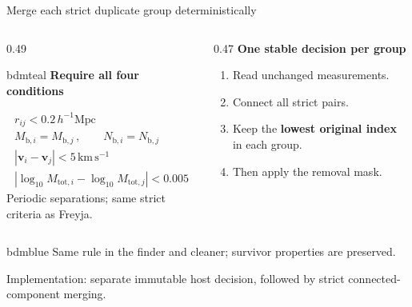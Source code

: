 \documentclass[UTF8]{beamer}
\newcommand{\bodyfont}{\fontsize{11}{13.1}\selectfont
  \setlength{\abovedisplayskip}{1.5mm}\setlength{\belowdisplayskip}{1.5mm}
  \setlength{\abovedisplayshortskip}{1mm}\setlength{\belowdisplayshortskip}{1mm}}
\newcommand{\evidence}[1]{\par\vfill{\fontsize{7.3}{9}\selectfont\color{coolgray}#1\par}}
\begin{document}
\begin{frame}{Merge each strict duplicate group deterministically}
  \bodyfont
  \begin{columns}[T,onlytextwidth]
    \begin{column}{0.49\textwidth}
      \begin{panel}{bdmteal}
        {\color{bdmteal}\bfseries Require all four conditions}\par
        \[
          \begin{gathered}
            r_{ij}<0.2\,h^{-1}\mathrm{Mpc} \\[0.4ex]
            M_{\mathrm b,i}=M_{\mathrm b,j}\,,\qquad N_{\mathrm b,i}=N_{\mathrm b,j} \\[0.4ex]
            |\boldsymbol{v}_i-\boldsymbol{v}_j|<5\,\mathrm{km\,s^{-1}} \\[0.4ex]
            |\log_{10}M_{\mathrm{tot},i}-\log_{10}M_{\mathrm{tot},j}|<0.005
          \end{gathered}
        \]
        {\small Periodic separations; same strict criteria as Freyja.}
      \end{panel}
    \end{column}
    \begin{column}{0.47\textwidth}
      {\color{bdmblue}\bfseries One stable decision per group}\par
      \vspace{2mm}
      \begin{enumerate}\setlength\itemsep{1.5mm}
        \item Read unchanged measurements.
        \item Connect all strict pairs.
        \item Keep the \textbf{lowest original index} in each group.
        \item Then apply the removal mask.
      \end{enumerate}
    \end{column}
  \end{columns}
  \vspace{2mm}
  \begin{panel}{bdmblue}
    Same rule in the finder and cleaner; survivor properties are preserved.
  \end{panel}
  \evidence{Implementation: separate immutable host decision, followed by strict connected-component merging.}
\end{frame}
\end{document}
